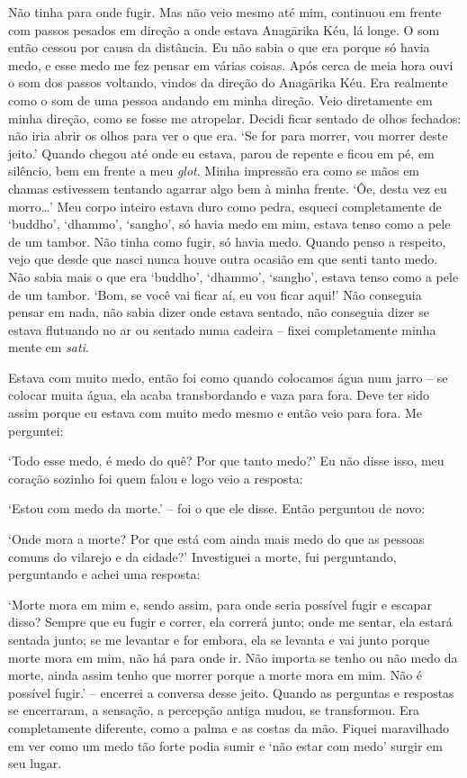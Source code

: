 Não tinha para onde fugir. Mas não veio mesmo até mim, continuou em
frente com passos pesados em direção a onde estava Anagārika Kéu, lá
longe. O som então cessou por causa da distância. Eu não sabia o que era
porque só havia medo, e esse medo me fez pensar em várias coisas. Após
cerca de meia hora ouvi o som dos passos voltando, vindos da direção do
Anagārika Kéu. Era realmente como o som de uma pessoa andando em minha
direção. Veio diretamente em minha direção, como se fosse me atropelar.
Decidi ficar sentado de olhos fechados: não iria abrir os olhos para ver
o que era. `Se for para morrer, vou morrer deste jeito.' Quando chegou
até onde eu estava, parou de repente e ficou em pé, em silêncio, bem em
frente a meu \emph{glot}. Minha impressão era como se mãos em chamas
estivessem tentando agarrar algo bem à minha frente. `Ôe, desta vez eu
morro\ldots{}' Meu corpo inteiro estava duro como pedra, esqueci
completamente de `buddho', `dhammo', `sangho', só havia medo em mim,
estava tenso como a pele de um tambor. Não tinha como fugir, só havia
medo. Quando penso a respeito, vejo que desde que nasci nunca houve
outra ocasião em que senti tanto medo. Não sabia mais o que era
`buddho', `dhammo', `sangho', estava tenso como a pele de um tambor.
`Bom, se você vai ficar aí, eu vou ficar aqui!' Não conseguia pensar em
nada, não sabia dizer onde estava sentado, não conseguia dizer se estava
flutuando no ar ou sentado numa cadeira -- fixei completamente minha
mente em \emph{sati}.

Estava com muito medo, então foi como quando colocamos água num jarro --
se colocar muita água, ela acaba transbordando e vaza para fora. Deve
ter sido assim porque eu estava com muito medo mesmo e então veio para
fora. Me perguntei:

`Todo esse medo, é medo do quê? Por que tanto medo?' Eu não disse isso,
meu coração sozinho foi quem falou e logo veio a resposta:

`Estou com medo da morte.' -- foi o que ele disse. Então perguntou de
novo:

`Onde mora a morte? Por que está com ainda mais medo do que as pessoas
comuns do vilarejo e da cidade?' Investiguei a morte, fui perguntando,
perguntando e achei uma resposta:

`Morte mora em mim e, sendo assim, para onde seria possível fugir e
escapar disso? Sempre que eu fugir e correr, ela correrá junto; onde me
sentar, ela estará sentada junto; se me levantar e for embora, ela se
levanta e vai junto porque morte mora em mim, não há para onde ir. Não
importa se tenho ou não medo da morte, ainda assim tenho que morrer
porque a morte mora em mim. Não é possível fugir.' -- encerrei a
conversa desse jeito. Quando as perguntas e respostas se encerraram, a
sensação, a percepção antiga mudou, se transformou. Era completamente
diferente, como a palma e as costas da mão. Fiquei maravilhado em ver
como um medo tão forte podia sumir e `não estar com medo' surgir em seu
lugar.


